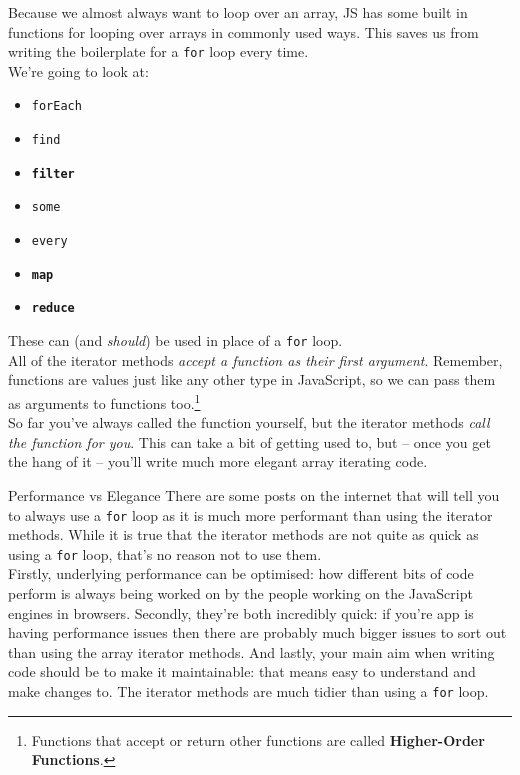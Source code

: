 Because we almost always want to loop over an array, JS has some built in functions for looping over arrays in commonly used ways. This saves us from writing the boilerplate for a \texttt{for} loop every time.
\\

We're going to look at:

\begin{itemize}
    \item \texttt{forEach}
    \item \texttt{find}
    \item \texttt{\textbf{filter}}
    \item \texttt{some}
    \item \texttt{every}
    \item \texttt{\textbf{map}}
    \item \texttt{\textbf{reduce}}
\end{itemize}

These can (and \textit{should}) be used in place of a \texttt{for} loop.
\\

All of the iterator methods \textit{accept a function as their first argument}. Remember, functions are values just like any other type in JavaScript, so we can pass them as arguments to functions too.\footnote{Functions that accept or return other functions are called \textbf{Higher-Order Functions}.}
\\

So far you've always called the function yourself, but the iterator methods \textit{call the function for you}. This can take a bit of getting used to, but – once you get the hang of it – you'll write much more elegant array iterating code.


\pagebreak

\begin{infobox}{Performance vs Elegance}
    There are some posts on the internet that will tell you to always use a \texttt{for} loop as it is much more performant than using the iterator methods. While it is true that the iterator methods are not quite as quick as using a \texttt{for} loop, that's no reason not to use them.
    \\

    Firstly, underlying performance can be optimised: how different bits of code perform is always being worked on by the people working on the JavaScript engines in browsers. Secondly, they're both incredibly quick: if you're app is having performance issues then there are probably much bigger issues to sort out than using the array iterator methods. And lastly, your main aim when writing code should be to make it maintainable: that means easy to understand and make changes to. The iterator methods are much tidier than using a \texttt{for} loop.

\end{infobox}



